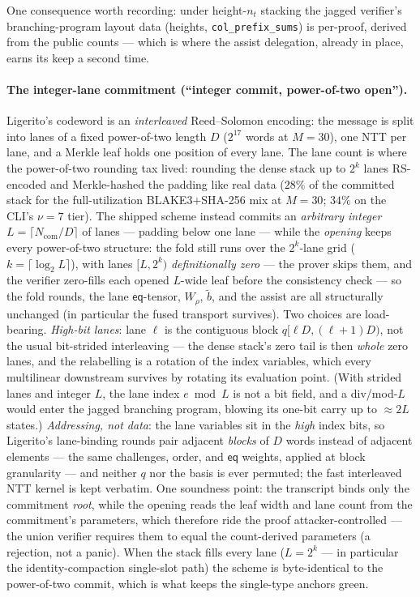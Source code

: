 \documentclass[11pt]{article}
\newcommand{\eq}{\mathsf{eq}}
\newcommand{\code}[1]{\texttt{#1}}
\theoremstyle{definition}
\begin{document}
One consequence worth recording: under height-$n_t$ stacking the jagged
verifier's branching-program layout data (heights,
\code{col\_prefix\_sums}) is per-proof, derived from the public counts
--- which is where the assist delegation, already in place, earns its
keep a second time.

\paragraph{The integer-lane commitment (``integer commit, power-of-two
open'').} Ligerito's codeword is an \emph{interleaved} Reed--Solomon
encoding: the message is split into lanes of a fixed power-of-two
length $D$ ($2^{17}$ words at $M = 30$), one NTT per lane, and a Merkle
leaf holds one position of every lane. The lane count is where the
power-of-two rounding tax lived: rounding the dense stack up to
$2^{k}$ lanes RS-encoded and Merkle-hashed the padding like real data
($28\%$ of the committed stack for the full-utilization
BLAKE3$+$SHA-256 mix at $M = 30$; $34\%$ on the CLI's $\nu = 7$ tier).
The shipped scheme instead commits an \emph{arbitrary integer}
$L = \lceil N_{\mathrm{com}} / D \rceil$ of lanes --- padding below one
lane --- while the \emph{opening} keeps every power-of-two structure:
the fold still runs over the $2^{k}$-lane grid
($k = \lceil \log_2 L \rceil$), with lanes $[L, 2^{k})$
\emph{definitionally zero} --- the prover skips them, and the verifier
zero-fills each opened $L$-wide leaf before the consistency check ---
so the fold rounds, the lane $\eq$-tensor, $W_\rho$, $\tilde b$, and
the assist are all structurally unchanged (in particular the fused
transport survives). Two choices are load-bearing. \emph{High-bit
lanes}: lane $\ell$ is the contiguous block
$q[\ell D, (\ell{+}1) D)$, not the usual bit-strided interleaving ---
the dense stack's zero tail is then \emph{whole} zero lanes, and the
relabelling is a rotation of the index variables, which every
multilinear downstream survives by rotating its evaluation point. (With
strided lanes and integer $L$, the lane index $e \bmod L$ is not a bit
field, and a div/mod-$L$ would enter the jagged branching program,
blowing its one-bit carry up to $\approx 2L$ states.) \emph{Addressing,
not data}: the lane variables sit in the \emph{high} index bits, so
Ligerito's lane-binding rounds pair adjacent \emph{blocks} of $D$ words
instead of adjacent elements --- the same challenges, order, and $\eq$
weights, applied at block granularity --- and neither $q$ nor the basis
is ever permuted; the fast interleaved NTT kernel is kept verbatim. One
soundness point: the transcript binds only the commitment \emph{root},
while the opening reads the leaf width and lane count from the
commitment's parameters, which therefore ride the proof
attacker-controlled --- the union verifier requires them to equal the
count-derived parameters (a rejection, not a panic). When the stack
fills every lane ($L = 2^{k}$ --- in particular the
identity-compaction single-slot path) the scheme is byte-identical to
the power-of-two commit, which is what keeps the single-type anchors
green.
\end{document}
